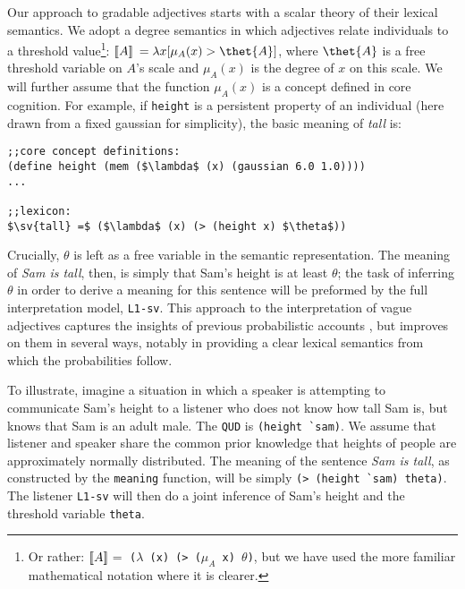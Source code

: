\documentclass[12pt]{article}
\newcommand{\llbracket}{\ensuremath{\left [\!\left [}}%
\newcommand{\rrbracket}{\ensuremath{\right ]\!\right ]}}
\providecommand{\sv}[1]{\ensuremath{\llbracket #1 \rrbracket}}
\newcommand{\lar}[1]{\ensuremath{\langle #1 \rangle}}
\newcounter{definition}
\begin{document}
Our approach to gradable adjectives starts with a scalar theory of their lexical semantics. 
We adopt a degree semantics in which adjectives relate individuals to a threshold value\footnote{Or rather: \sv{A}${=}$ \texttt{($\lambda$ (x) (> ($\mu_A$ x) $\theta$)}, but we have used the more familiar mathematical notation where it is clearer.}: \sv{A} $= \lambda x [ \mu_A(x) > \thet{A}]$, where $\thet{A}$ is a free threshold variable on $A$'s scale and $\mu_A(x)$ is the degree of $x$ on this scale. We will further assume that the function $\mu_A(x)$ is a concept defined in core cognition. For example, if \lstinline{height} is a persistent property of an individual (here drawn from a fixed gaussian for simplicity), the basic meaning of \emph{tall} is:
\begin{lstlisting}[mathescape]
;;core concept definitions:
(define height (mem ($\lambda$ (x) (gaussian 6.0 1.0))))
...

;;lexicon:
$\sv{tall} =$ ($\lambda$ (x) (> (height x) $\theta$))
\end{lstlisting}
%
Crucially, $\theta$ is left as a free variable in the semantic representation. The meaning of \emph{Sam is tall}, then, is simply that Sam's height is at least $\theta$; the task of inferring $\theta$ in order to derive a meaning for this sentence will be preformed by the full interpretation model, \lstinline{L1-sv}. This approach to the interpretation of vague adjectives captures the insights of previous probabilistic accounts \citep{edgington97,schmidtetal09,frazeebeaver10,lassiter11}, but improves on them in several ways, notably in providing a clear lexical semantics from which the probabilities follow.


To illustrate, imagine a situation in which a speaker is attempting to communicate Sam's height to a listener who does not know how tall Sam is, but knows that Sam is an adult male. The \lstinline{QUD} is \lstinline{(height `sam)}. We assume that listener and speaker share the common prior knowledge that heights of people are approximately normally distributed. The meaning of the sentence \emph{Sam is tall}, as constructed by the \lstinline{meaning} function, will be simply \lstinline[mathescape,keepspaces]{(> (height `sam) theta)}.
The listener \lstinline{L1-sv} will then do a joint inference of Sam's height and the threshold variable \lstinline{theta}.
\end{document}
